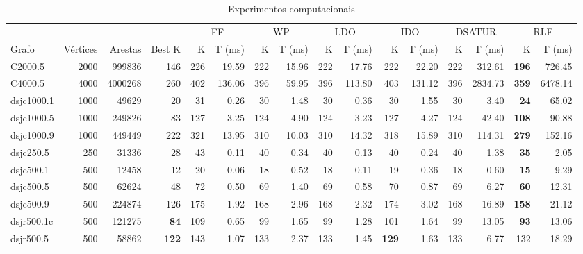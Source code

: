 \begin{table*}[tbh]
    \caption{Experimentos computacionais}
    \label{tab:experiments}
    \begin{adjustbox}{width=0.934\textwidth}%
        \centering
    \small
    \begin{minipage}[b]{\textwidth}
\begin{tabular}{@{} lrrrrrrrrrrrrrrr @{}}
\toprule
& & & & \multicolumn{2}{c}{FF} & \multicolumn{2}{c}{WP} & \multicolumn{2}{c}{LDO} & \multicolumn{2}{c}{IDO} & \multicolumn{2}{c}{DSATUR} & \multicolumn{2}{c}{RLF}\\
\cmidrule(lr){5-6}\cmidrule(lr){7-8}\cmidrule(lr){9-10}\cmidrule(lr){11-12}\cmidrule(lr){13-14}\cmidrule(lr){15-16}
Grafo & Vértices & Arestas & Best K & K & T (ms) & K & T (ms) & K & T (ms) & K & T (ms) & K & T (ms) & K & T (ms) \\
\midrule
C2000.5 & 2000 & 999836 & 146 & 226 & 19.59 & 222 & 15.96 & 222 & 17.76 & 222 & 22.20 & 222 & 312.61 & \textbf{196} & 726.45 \\
C4000.5 & 4000 & 4000268 & 260 & 402 & 136.06 & 396 & 59.95 & 396 & 113.80 & 403 & 131.12 & 396 & 2834.73 & \textbf{359} & 6478.14 \\
dsjc1000.1 & 1000 & 49629 & 20 & 31 & 0.26 & 30 & 1.48 & 30 & 0.36 & 30 & 1.55 & 30 & 3.40 & \textbf{24} & 65.02 \\
dsjc1000.5 & 1000 & 249826 & 83 & 127 & 3.25 & 124 & 4.90 & 124 & 3.23 & 127 & 4.27 & 124 & 42.40 & \textbf{108} & 90.88 \\
dsjc1000.9 & 1000 & 449449 & 222 & 321 & 13.95 & 310 & 10.03 & 310 & 14.32 & 318 & 15.89 & 310 & 114.31 & \textbf{279} & 152.16 \\
dsjc250.5 & 250 & 31336 & 28 & 43 & 0.11 & 40 & 0.34 & 40 & 0.13 & 40 & 0.24 & 40 & 1.38 & \textbf{35} & 2.05 \\
dsjc500.1 & 500 & 12458 & 12 & 20 & 0.06 & 18 & 0.52 & 18 & 0.11 & 19 & 0.36 & 18 & 0.60 & \textbf{15} & 9.29 \\
dsjc500.5 & 500 & 62624 & 48 & 72 & 0.50 & 69 & 1.40 & 69 & 0.58 & 70 & 0.87 & 69 & 6.27 & \textbf{60} & 12.31 \\
dsjc500.9 & 500 & 224874 & 126 & 175 & 1.92 & 168 & 2.96 & 168 & 2.32 & 174 & 3.02 & 168 & 16.89 & \textbf{158} & 21.12 \\
dsjr500.1c & 500 & 121275 & \textbf{84} & 109 & 0.65 & 99 & 1.65 & 99 & 1.28 & 101 & 1.64 & 99 & 13.05 & \textbf{93} & 13.06 \\
dsjr500.5 & 500 & 58862 & \textbf{122} & 143 & 1.07 & 133 & 2.37 & 133 & 1.45 & \textbf{129} & 1.63 & 133 & 6.77 & 132 & 18.29 \\

\end{tabular}
\end{minipage}
\end{adjustbox}
\end{table*}
